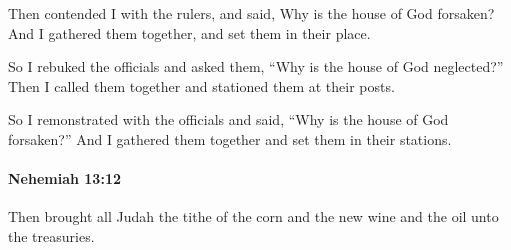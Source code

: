 			\begin{versebox}
					\item[BHS] 
					\item[LXX] 
					\item[ASV] Then contended I with the rulers, and said, Why is the house of God forsaken? And I gathered them together, and set them in their place.
					\item[NIV] So I rebuked the officials and asked them, “Why is the house of God neglected?” Then I called them together and stationed them at their posts.
					\item[NRSV] So I remonstrated with the officials and said, “Why is the house of God forsaken?” And I gathered them together and set them in their stations.
			\end{versebox}

		\paragraph{Nehemiah 13:12} %
			\label{NEHEMIAH-13-12}

			Then brought all Judah the tithe of the corn and the new wine and the oil unto the treasuries.

